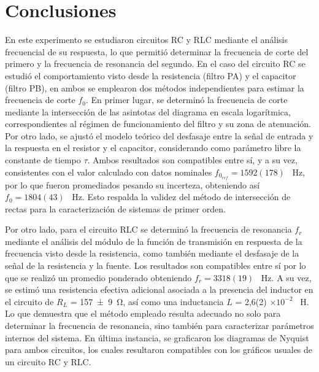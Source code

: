 \section{Conclusiones}

En este experimento se estudiaron circuitos RC y RLC mediante el análisis frecuencial de su respuesta, lo que permitió determinar la frecuencia de corte del primero y la frecuencia de resonancia del segundo. En el caso del circuito RC se estudió el comportamiento visto desde la resistencia (filtro PA) y el capacitor (filtro PB), en ambos se emplearon dos métodos independientes para estimar la frecuencia de corte \(f_0\). En primer lugar, se determinó la frecuencia de corte mediante la intersección de las asintotas del diagrama en escala logarítmica, correspondientes al régimen de funcionamiento del filtro y su zona de atenuación. Por otro lado, se ajustó el modelo teórico del desfasaje entre la señal de entrada y la respuesta en el resistor y el capacitor, considerando como parámetro libre la constante de tiempo $\tau$. Ambos resultados son compatibles entre sí, y a su vez, consistentes con el valor calculado con datos nominales \(f_{0_{ref}} = 1592(178)\) \SI{}{\hertz}, por lo que fueron promediados pesando su incerteza, obteniendo así \(f_0 = 1804(43)\) \SI{}{\hertz}. Esto respalda la validez del método de intersección de rectas para la caracterización de sistemas de primer orden.

Por otro lado, para el circuito RLC se determinó la frecuencia de resonancia \(f_r\) mediante el análisis del módulo de la función de transmisión en respuesta de la frecuencia visto desde la resistencia, como también mediante el desfasaje de la señal de la resistencia y la fuente. Los resultados son compatibles entre sí por lo que se realizó un promedio ponderado obteniendo \(f_r= 3318(19)\) \SI{}{\hertz}. A su vez, se estimó una resistencia efectiva adicional asociada a la presencia del inductor en el circuito de $R_L$ = \SI{157(9)}{\ohm}, así como una inductancia $L$ = 2,6(2) \(\times 10^{-2}\) \SI{}{\henry}. Lo que demuestra que el método empleado resulta adecuado no solo para determinar la frecuencia de resonancia, sino también para caracterizar parámetros internos del sistema. En última instancia, se graficaron los diagramas de Nyquist para ambos circuitos, los cuales resultaron compatibles con los gráficos usuales de un circuito RC y RLC.
